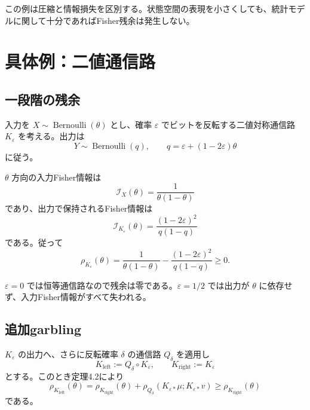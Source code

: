 \documentclass[a4paper,11pt]{ltjsarticle}
\theoremstyle{definition}
\theoremstyle{plain}
\newcommand{\FI}{\mathcal I}
\begin{document}
この例は圧縮と情報損失を区別する。状態空間の表現を小さくしても、統計モデルに関して十分であればFisher残余は発生しない。

\section{具体例：二値通信路}

\subsection{一段階の残余}

入力を $X\sim\operatorname{Bernoulli}(\theta)$ とし、確率 $\varepsilon$ でビットを反転する二値対称通信路 $K_\varepsilon$ を考える。出力は
\begin{equation}
 Y\sim\operatorname{Bernoulli}(q),
 \qquad
 q=\varepsilon+(1-2\varepsilon)\theta
\end{equation}
に従う。

$\theta$ 方向の入力Fisher情報は
\begin{equation}
 \FI_X(\theta)
 =\frac{1}{\theta(1-\theta)}
\end{equation}
であり、出力で保持されるFisher情報は
\begin{equation}
 \FI_{K_\varepsilon}(\theta)
 =
 \frac{(1-2\varepsilon)^2}{q(1-q)}
\end{equation}
である。従って
\begin{equation}
 \rho_{K_\varepsilon}(\theta)
 =
 \frac{1}{\theta(1-\theta)}
 -
 \frac{(1-2\varepsilon)^2}{q(1-q)}
 \geq0.
 \label{eq:bsc-residual}
\end{equation}

$\varepsilon=0$ では恒等通信路なので残余は零である。$\varepsilon=1/2$ では出力が $\theta$ に依存せず、入力Fisher情報がすべて失われる。

\subsection{追加garbling}

$K_\varepsilon$ の出力へ、さらに反転確率 $\delta$ の通信路 $Q_\delta$ を適用し
\begin{equation}
 K_{\mathrm{left}}
 :=Q_\delta\circ K_\varepsilon,
 \qquad
 K_{\mathrm{right}}
 :=K_\varepsilon
\end{equation}
とする。このとき定理4.2により
\begin{equation}
 \rho_{K_{\mathrm{left}}}(\theta)
 =
 \rho_{K_{\mathrm{right}}}(\theta)
 +
 \rho_{Q_\delta}(K_{\varepsilon*}\mu;
                  K_{\varepsilon*}v)
 \geq
 \rho_{K_{\mathrm{right}}}(\theta)
\end{equation}
である。
\end{document}
